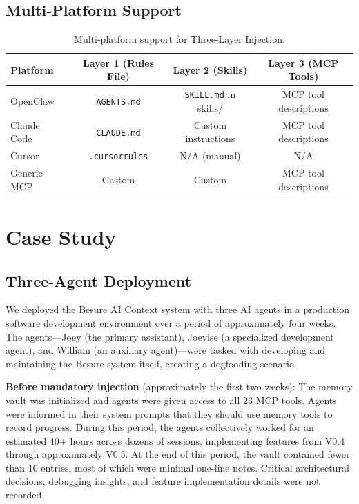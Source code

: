 \documentclass[11pt]{article}
\begin{document}
\subsection{Multi-Platform Support}

\begin{table}[H]
\centering
\caption{Multi-platform support for Three-Layer Injection.}
\label{tab:platforms}
\small
\begin{tabular}{lccc}
\toprule
\textbf{Platform} & \textbf{Layer 1 (Rules File)} & \textbf{Layer 2 (Skills)} & \textbf{Layer 3 (MCP Tools)} \\
\midrule
OpenClaw & \texttt{AGENTS.md} & \texttt{SKILL.md} in skills/ & MCP tool descriptions \\
Claude Code & \texttt{CLAUDE.md} & Custom instructions & MCP tool descriptions \\
Cursor & \texttt{.cursorrules} & N/A (manual) & N/A \\
Generic MCP & Custom & Custom & MCP tool descriptions \\
\bottomrule
\end{tabular}
\end{table}


\section{Case Study}

\subsection{Three-Agent Deployment}

We deployed the Besure AI Context system with three AI agents in a production software development environment over a period of approximately four weeks. The agents---Joey (the primary assistant), Joevise (a specialized development agent), and William (an auxiliary agent)---were tasked with developing and maintaining the Besure system itself, creating a dogfooding scenario.

\textbf{Before mandatory injection} (approximately the first two weeks): The memory vault was initialized and agents were given access to all 23 MCP tools. Agents were informed in their system prompts that they should use memory tools to record progress. During this period, the agents collectively worked for an estimated 40+ hours across dozens of sessions, implementing features from V0.4 through approximately V0.5. At the end of this period, the vault contained fewer than 10 entries, most of which were minimal one-line notes. Critical architectural decisions, debugging insights, and feature implementation details were not recorded.
\end{document}
